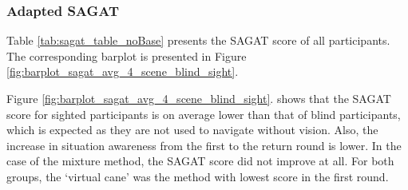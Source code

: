\subsubsection{Adapted SAGAT}
\label{subsubsec:results_adapted_sagat_2}

Table \ref{tab:sagat_table_noBase} presents the SAGAT score of all participants. The corresponding barplot is presented in Figure \ref{fig:barplot_sagat_avg_4_scene_blind_sight}.



Figure \ref{fig:barplot_sagat_avg_4_scene_blind_sight}. shows that the SAGAT score for sighted participants is on average lower than that of blind participants, which is expected as they are not used to navigate without vision. Also, the increase in situation awareness from the first to the return round is lower. In the case of the mixture method, the SAGAT score did not improve at all. For both groups, the ‘virtual cane’ was the method with lowest score in the first round.

